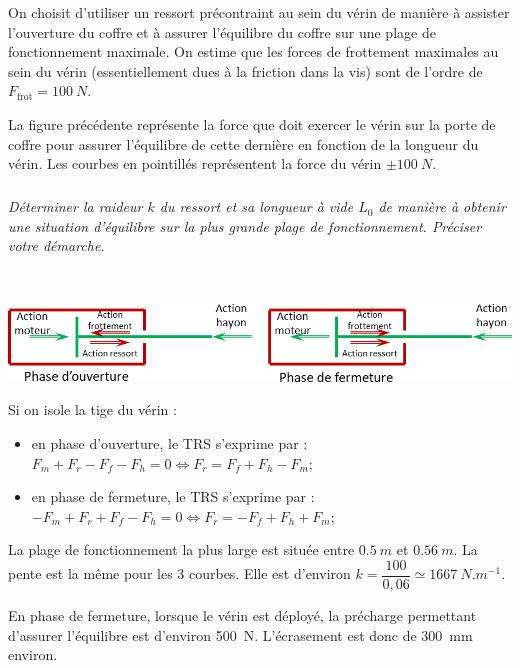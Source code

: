\documentclass[10pt,fleqn]{article} %
\begin{document}
\begin{multicols}{2}
\begin{multicols}{2}
On choisit d’utiliser un ressort précontraint au sein du vérin de manière à assister l’ouverture du coffre et à assurer l’équilibre du coffre sur une plage de fonctionnement maximale. On estime que les forces de frottement maximales au sein du vérin (essentiellement dues à la friction dans la vis) sont de l’ordre de $F_{\text{frot}}=\SI{100}{N}$. 

La figure précédente représente la force que doit exercer le vérin sur la porte de coffre pour assurer l’équilibre de cette dernière en fonction de la longueur du vérin. Les courbes en pointillés représentent la force du vérin $\pm\SI{100}{N}$.
\fi




\subparagraph{}
\textit{Déterminer la raideur $k$ du ressort et sa longueur à vide $L_0$ de manière à obtenir une situation d’équilibre
sur la plus grande plage de fonctionnement. Préciser votre démarche.}
\ifprof
\begin{corrige}~\\

\begin{center}
\includegraphics[width=\linewidth]{images/cor_04}
\end{center}

Si on isole la tige du vérin :
\begin{itemize}
\item en phase d'ouverture, le TRS s'exprime par : $F_m + F_r - F_f - F_h =0\Leftrightarrow F_r = F_f + F_h - F_m$; 
\item en phase de fermeture, le TRS s'exprime par : $-F_m + F_r + F_f - F_h =0 \Leftrightarrow F_r = -F_f + F_h + F_m$;
\end{itemize}





La plage de fonctionnement la plus large est située entre $\SI{0,5}{m}$ et $\SI{0,56}{m}$. La pente est la même pour les 3 courbes. Elle est d'environ $k=\dfrac{100}{0,06}\simeq \SI{1667}{N.m^{-1}}$.

En phase de fermeture, lorsque le vérin est déployé, la précharge permettant d'assurer l'équilibre est d'environ \SI{500}{N}.  L'écrasement est donc  de \SI{300}{mm} environ.


\end{corrige}
\end{multicols}
\end{multicols}
\end{document}
